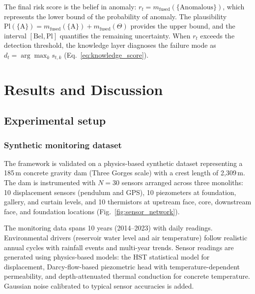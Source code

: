 \documentclass[preprint,12pt,review]{elsarticle}
\begin{document}
The final risk score is the belief in anomaly: $r_t = m_{\mathrm{fused}}(\{\text{Anomalous}\})$, which represents the lower bound of the probability of anomaly. The plausibility $\mathrm{Pl}(\{\text{A}\}) = m_{\mathrm{fused}}(\{\text{A}\}) + m_{\mathrm{fused}}(\Theta)$ provides the upper bound, and the interval $[\mathrm{Bel}, \mathrm{Pl}]$ quantifies the remaining uncertainty. When $r_t$ exceeds the detection threshold, the knowledge layer diagnoses the failure mode as $d_t = \arg\max_k s_{t,k}$ (Eq.~\ref{eq:knowledge_score}).

\section{Results and Discussion}
\label{sec:results}

\subsection{Experimental setup}
\label{sec:setup}

\subsubsection{Synthetic monitoring dataset}

The framework is validated on a physics-based synthetic dataset representing a 185\,m concrete gravity dam (Three Gorges scale) with a crest length of 2{,}309\,m. The dam is instrumented with $N = 30$ sensors arranged across three monoliths: 10 displacement sensors (pendulum and GPS), 10 piezometers at foundation, gallery, and curtain levels, and 10 thermistors at upstream face, core, downstream face, and foundation locations (Fig.~\ref{fig:sensor_network}).

The monitoring data spans 10 years (2014--2023) with daily readings. Environmental drivers (reservoir water level and air temperature) follow realistic annual cycles with rainfall events and multi-year trends. Sensor readings are generated using physics-based models: the HST statistical model for displacement, Darcy-flow-based piezometric head with temperature-dependent permeability, and depth-attenuated thermal conduction for concrete temperature. Gaussian noise calibrated to typical sensor accuracies is added.
\end{document}
